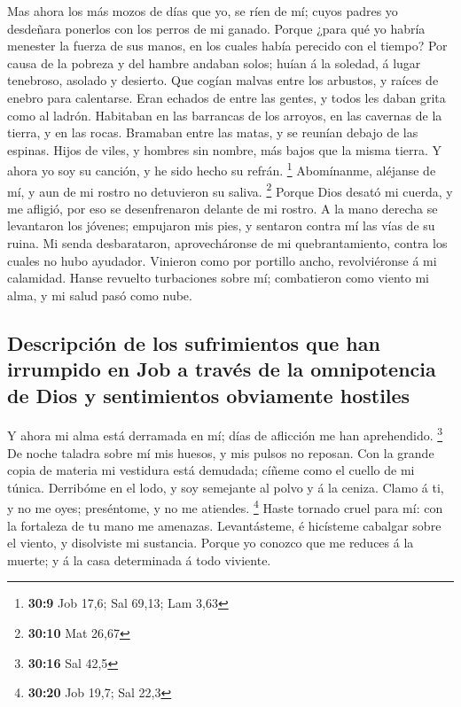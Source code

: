  Mas ahora los más mozos de días que yo, se ríen de mí;
cuyos padres yo desdeñara ponerlos con los perros de mi ganado.
 Porque ¿para qué yo habría menester la fuerza de sus
manos, en los cuales había perecido con el tiempo?  Por
causa de la pobreza y del hambre andaban solos; huían á la soledad, á
lugar tenebroso, asolado y desierto.  Que cogían malvas
entre los arbustos, y raíces de enebro para calentarse. 
Eran echados de entre las gentes, y todos les daban grita como al
ladrón.  Habitaban en las barrancas de los arroyos, en las
cavernas de la tierra, y en las rocas.  Bramaban entre las
matas, y se reunían debajo de las espinas.  Hijos de
viles, y hombres sin nombre, más bajos que la misma tierra.
 Y ahora yo soy su canción, y he sido hecho su refrán.
\footnote{\textbf{30:9} Job 17,6; Sal 69,13; Lam 3,63} 
Abomínanme, aléjanse de mí, y aun de mi rostro no detuvieron su saliva.
\footnote{\textbf{30:10} Mat 26,67}  Porque Dios desató
mi cuerda, y me afligió, por eso se desenfrenaron delante de mi rostro.
 A la mano derecha se levantaron los jóvenes; empujaron
mis pies, y sentaron contra mí las vías de su ruina.  Mi
senda desbarataron, aprovecháronse de mi quebrantamiento, contra los
cuales no hubo ayudador.  Vinieron como por portillo
ancho, revolviéronse á mi calamidad.  Hanse revuelto
turbaciones sobre mí; combatieron como viento mi alma, y mi salud pasó
como nube.

\hypertarget{descripciuxf3n-de-los-sufrimientos-que-han-irrumpido-en-job-a-travuxe9s-de-la-omnipotencia-de-dios-y-sentimientos-obviamente-hostiles}{%
\subsection{Descripción de los sufrimientos que han irrumpido en Job a
través de la omnipotencia de Dios y sentimientos obviamente
hostiles}\label{descripciuxf3n-de-los-sufrimientos-que-han-irrumpido-en-job-a-travuxe9s-de-la-omnipotencia-de-dios-y-sentimientos-obviamente-hostiles}}

 Y ahora mi alma está derramada en mí; días de aflicción
me han aprehendido. \footnote{\textbf{30:16} Sal 42,5} 
De noche taladra sobre mí mis huesos, y mis pulsos no reposan.
 Con la grande copia de materia mi vestidura está
demudada; cíñeme como el cuello de mi túnica.  Derribóme
en el lodo, y soy semejante al polvo y á la ceniza. 
Clamo á ti, y no me oyes; preséntome, y no me atiendes. \footnote{\textbf{30:20}
  Job 19,7; Sal 22,3}  Haste tornado cruel para mí: con
la fortaleza de tu mano me amenazas.  Levantásteme, é
hicísteme cabalgar sobre el viento, y disolviste mi sustancia.
 Porque yo conozco que me reduces á la muerte; y á la
casa determinada á todo viviente.

